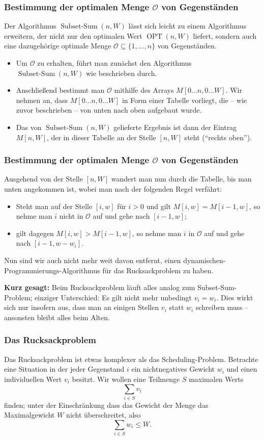\documentclass[smaller]{beamer}
\renewcommand{\O}{\mathcal{O}}
\DeclareMathOperator{\opt}{OPT}
\DeclareMathOperator{\ssum}{Subset-Sum}
\begin{document}
\begin{frame}
 \frametitle{Bestimmung der optimalen Menge $\O$ von Gegenständen}
 Der Algorithmus $\ssum{(n,W)}$ lässt sich leicht zu einem Algorithmus erweitern, der nicht nur den optimalen Wert $\opt{(n,W)}$ liefert, \alert{sondern auch eine dazugehörige optimale Menge $\O \subseteq \bigl\{ 1,\ldots,n \bigr\}$ von Gegenständen.}
 \begin{itemize}
 \item  Um $\O$ zu erhalten, führt man zunächst den Algorithmus $\ssum{(n,W)}$ wie beschrieben durch.
 \item Anschließend bestimmt man $\O$ mithilfe des Arrays $M[0 \ldots n, 0 \ldots W]$. Wir nehmen an, dass $M[0 \ldots n, 0 \ldots W]$ in Form einer Tabelle vorliegt, die -- wie zuvor beschrieben -- von unten nach oben aufgebaut wurde.
 \item Das von $\ssum{(n,W)}$ gelieferte Ergebnis ist dann der Eintrag $M[n,W]$, der in dieser Tabelle an der Stelle $[n,W]$ steht (\enquote{rechts oben}).
 \end{itemize}
\end{frame}

\begin{frame}
 \frametitle{Bestimmung der optimalen Menge $\O$ von Gegenständen}
 Ausgehend von der Stelle $[n,W]$ wandert man nun durch die Tabelle, bis man unten angekommen ist, wobei man nach der folgenden Regel verfährt:
 \begin{itemize}
 \item Steht man auf der Stelle $[i,w]$ für $i>0$ und gilt $M[i,w] = M[i-1,w]$, so nehme man $i$ nicht in $\O$ auf und gehe nach $[i-1,w]$;
 \item gilt dagegen $M[i,w] > M[i-1,w]$, so nehme man $i$ in $\O$ auf und gehe nach $[i-1,w-w_i]$.
 \end{itemize} \medskip

Nun sind wir auch nicht mehr weit davon entfernt, einen dynamischen-Programmierungs-Algorithmus für das \alert{Rucksackproblem} zu haben. \\ \medskip

\textbf{Kurz gesagt:} \alert{Beim Rucksackproblem läuft alles analog zum Subset-Sum-Problem; einziger Unterschied}: Es gilt nicht mehr unbedingt $v_i=w_i$. Dies wirkt sich nur insofern aus, dass man an einigen Stellen $v_i$ statt $w_i$ schreiben muss -- \alert{ansonsten bleibt alles beim Alten.}
\end{frame}

\begin{frame}
 \frametitle{Das Rucksackproblem}
 Das Rucksackproblem ist etwas komplexer als das Scheduling-Problem. Betrachte eine Situation in der jeder Gegenstand $i$ ein nichtnegatives Gewicht $w_i$ und einen individuellen Wert $v_i$ besitzt. Wir wollen eine Teilmenge $S$ \alert{maximalen Werts} $$\sum\limits_{i \in S}{v_i}$$ finden; unter der Einschränkung dass das Gewicht der Menge \alert{das Maximalgewicht $W$ nicht überschreitet}, also $$\sum\limits_{i \in S}{w_i} \leq W.$$
\end{frame}
\end{document}
